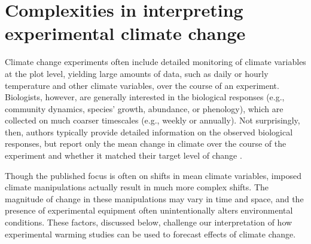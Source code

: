 \documentclass{article}
\begin{document}
\section* {Complexities in interpreting experimental climate change} 
Climate change experiments often include detailed monitoring of climate variables at the plot level, yielding large amounts of data, such as daily or hourly temperature and other climate variables, over the course of an experiment. Biologists, however, are generally interested in the biological responses (e.g., community dynamics, species' growth, abundance, or phenology), which are collected on much coarser timescales (e.g., weekly or annually). Not surprisingly, then, authors typically provide detailed information on the observed biological responses, but report only the mean change in climate over the course of the experiment and whether it matched their target level of change \citep[e.g.,][]{price1998,rollinson2012,clark2014a,clark2014b}. 

\par Though the published focus is often on shifts in mean climate variables, imposed climate manipulations actually result in much more complex shifts. The magnitude of change in these manipulations may vary in time and space, and the presence of experimental equipment often unintentionally alters environmental conditions. These factors, discussed below, challenge our interpretation of how experimental warming studies can be used to forecast effects of climate change.
\end{document}
